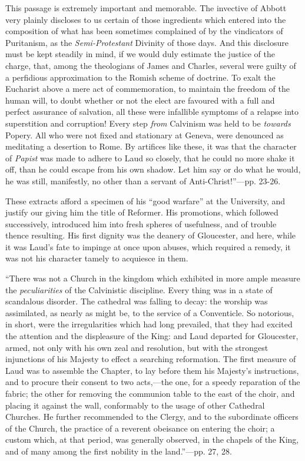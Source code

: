 This passage is extremely important
and memorable. The invective of Abbott very plainly discloses to us
certain of those ingredients which entered into the composition of what
has been sometimes complained of by the vindicators of Puritanism, as
the \emph{Semi-Protestant} Divinity of those days. And this disclosure
must be kept steadily in mind, if we would duly estimate the justice of
the charge, that, among the theologians of James and Charles, several
were guilty of a perfidious approximation to the Romish scheme of
doctrine. To exalt the Eucharist above a mere act of commemoration, to
maintain the freedom of the human will, to doubt whether or not the
elect are favoured with a full and perfect assurance of salvation, all
these were infallible symptoms of a relapse into superstition and
corruption! Every step \emph{from} Calvinism was held to be \emph{towards}
Popery. All who were not fixed and stationary at Geneva, were denounced
as meditating a desertion to Rome. By artifices like these, it was that
the character of \emph{Papist} was made to adhere to Laud so closely,
that he could no more shake it off, than he could escape from his own
shadow. Let him say or do what he would, he was still, manifestly, no
other than a servant of Anti-Christ!''—pp. 23-26.

These extracts afford a specimen of his ``good
warfare'' at the University, and justify our giving him the title of
Reformer. His promotions, which followed successively, introduced him
into fresh spheres of usefulness, and of trouble thence resulting. His
first dignity was the deanery of Gloucester, and here, while it was Laud's
fate to impinge at once upon abuses, which required a remedy, it was not
his character tamely to acquiesce in them.

``There was not a Church in the
kingdom which exhibited in more ample measure the \emph{peculiarities}
of the Calvinistic discipline. Every thing was in a state of scandalous
disorder. The cathedral was falling to decay: the worship was
assimilated, as nearly as might be, to the service of a Conventicle. So
notorious, in short, were the irregularities which had long prevailed,
that they had excited the attention and the displeasure of the King: and
Laud departed for Gloucester, armed, not only with his own zeal and
resolution, but with the strongest injunctions of
his Majesty to effect a searching reformation. The first measure of Laud
was to assemble the Chapter, to lay before them his Majesty's
instructions, and to procure their consent to two acts,—the one, for a
speedy reparation of the fabric; the other for removing the communion
table to the east of the choir, and placing it against the wall,
conformably to the usage of other Cathedral Churches. He further
recommended to the Clergy, and to the subordinate officers of the
Church, the practice of a reverent obeisance on entering the choir; a
custom which, at that period, was generally observed, in the chapels of
the King, and of many among the first nobility in the land.''—pp. 27,
28.

